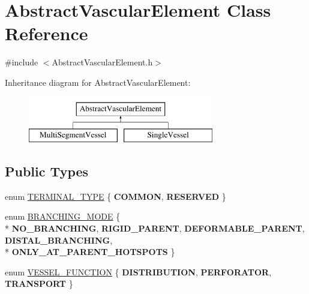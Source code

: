 \hypertarget{class_abstract_vascular_element}{}\section{Abstract\+Vascular\+Element Class Reference}
\label{class_abstract_vascular_element}


{\ttfamily \#include $<$Abstract\+Vascular\+Element.\+h$>$}

Inheritance diagram for Abstract\+Vascular\+Element\+:\begin{figure}[H]
\begin{center}
\leavevmode
\includegraphics[height=2.000000cm]{d6/db2/class_abstract_vascular_element}
\end{center}
\end{figure}
\subsection*{Public Types}
\begin{DoxyCompactItemize}
\item 
enum \hyperlink{class_abstract_vascular_element_a9c7d6ae9fe8c220ddad143208b0a5a11}{T\+E\+R\+M\+I\+N\+A\+L\+\_\+\+T\+Y\+PE} \{ {\bfseries C\+O\+M\+M\+ON}, 
{\bfseries R\+E\+S\+E\+R\+V\+ED}
 \}
\item 
enum \hyperlink{class_abstract_vascular_element_a2f7b3a097b944cd0b056fee00b93c860}{B\+R\+A\+N\+C\+H\+I\+N\+G\+\_\+\+M\+O\+DE} \{ \\*
{\bfseries N\+O\+\_\+\+B\+R\+A\+N\+C\+H\+I\+NG}, 
{\bfseries R\+I\+G\+I\+D\+\_\+\+P\+A\+R\+E\+NT}, 
{\bfseries D\+E\+F\+O\+R\+M\+A\+B\+L\+E\+\_\+\+P\+A\+R\+E\+NT}, 
{\bfseries D\+I\+S\+T\+A\+L\+\_\+\+B\+R\+A\+N\+C\+H\+I\+NG}, 
\\*
{\bfseries O\+N\+L\+Y\+\_\+\+A\+T\+\_\+\+P\+A\+R\+E\+N\+T\+\_\+\+H\+O\+T\+S\+P\+O\+TS}
 \}
\item 
enum \hyperlink{class_abstract_vascular_element_a7d7b7863aae4952ba79a590ee65702ec}{V\+E\+S\+S\+E\+L\+\_\+\+F\+U\+N\+C\+T\+I\+ON} \{ {\bfseries D\+I\+S\+T\+R\+I\+B\+U\+T\+I\+ON}, 
{\bfseries P\+E\+R\+F\+O\+R\+A\+T\+OR}, 
{\bfseries T\+R\+A\+N\+S\+P\+O\+RT}
 \}
\end{DoxyCompactItemize}
